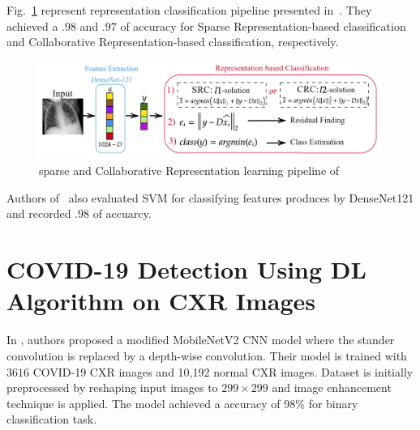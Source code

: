 Fig.~\ref{fig:RC} represent representation classification pipeline presented in~\cite{ar}. They achieved a $.98$ and $.97$ of accuracy for Sparse Representation-based classification and Collaborative Representation-based classification, respectively. 
\begin{figure}
    \centering
    \includegraphics[width=\textwidth]{Figures/RCpipline.png}
    \caption{\label{fig:RC} sparse and Collaborative Representation learning pipeline of~\cite{ar}}
\end{figure}
Authors of~\cite{ar} also evaluated SVM for classifying features produces by DenseNet121 and recorded $.98$ of accuarcy.



  
  
\section{COVID-19 Detection Using DL Algorithm on CXR Images}

In \cite{akt}, authors proposed a modified MobileNetV2 CNN model where the stander convolution is replaced by a depth-wise convolution. Their model is trained with $3616$ COVID-19 CXR images and 10,192 normal CXR images. Dataset is initially preprocessed by reshaping input images to $299\times299$ and image enhancement technique is applied. The model achieved a accuracy of 98\% for binary classification task.

